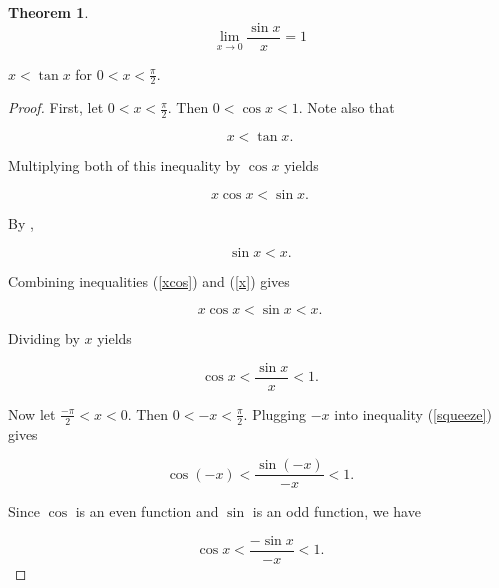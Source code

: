 \documentclass[12pt]{article}
\newtheorem{thm*}{Theorem}
\begin{document}
\begin{thm*}
$$\lim_{x \to 0} \frac{\sin x}{x}=1$$
\end{thm*}

 $x<\tan x$ for $\displaystyle 0<x<\frac{\pi}{2}$.  

\begin{proof}

First, let $\displaystyle 0<x<\frac{\pi}{2}$.  Then $0<\cos x<1$.  Note also that

\begin{equation}
\label{tan}
x<\tan x.
\end{equation}

Multiplying both  of this inequality by $\cos x$ yields

\begin{equation}
\label{xcos}
x\cos x<\sin x.
\end{equation}

By ,

\begin{equation}
\label{x}
\sin x<x.
\end{equation}

Combining inequalities (\ref{xcos}) and (\ref{x}) gives

\begin{equation}
\label{sin}
x\cos x<\sin x<x.
\end{equation}

Dividing by $x$ yields

\begin{equation}
\label{squeeze}
\cos x<\frac{\sin x}{x}<1.
\end{equation}

Now let $\displaystyle \frac{-\pi}{2}<x<0$.  Then $\displaystyle 0<-x<\frac{\pi}{2}$.  Plugging $-x$ into inequality (\ref{squeeze}) gives

\begin{equation}
\label{squeeze-}
\cos (-x)<\frac{\sin (-x)}{-x}<1.
\end{equation}

Since $\cos$ is an even function and $\sin$ is an odd function, we have

\begin{equation}
\label{-squeeze}
\cos x<\frac{-\sin x}{-x}<1.
\end{equation}


\end{proof}
\end{document}
